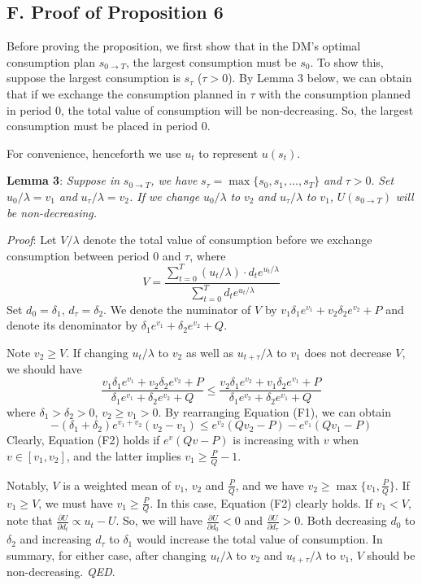\documentclass[
  12pt,
]{article}
\begin{document}
\hypertarget{f.-proof-of-proposition-6}{%
\subsection*{F. Proof of Proposition
6}\label{f.-proof-of-proposition-6}}

Before proving the proposition, we first show that in the DM's optimal
consumption plan \(s_{0\rightarrow T}\), the largest consumption must be
\(s_0\). To show this, suppose the largest consumption is \(s_\tau\)
(\(\tau>0\)). By Lemma 3 below, we can obtain that if we exchange the
consumption planned in \(\tau\) with the consumption planned in period
0, the total value of consumption will be non-decreasing. So, the
largest consumption must be placed in period 0.

For convenience, henceforth we use \(u_t\) to represent \(u(s_t)\).

\noindent \textbf{Lemma 3}: \emph{Suppose in}
\(s_{0\rightarrow T}\)\emph{, we have}
\(s_\tau= \max\{s_0,s_1,...,s_T\}\) \emph{and} \(\tau>0\). \emph{Set}
\(u_0/\lambda=v_1\) \emph{and} \(u_{\tau}/\lambda=v_2\)\emph{. If we
change} \(u_0/\lambda\) \emph{to} \(v_2\) \emph{and}
\(u_{\tau}/\lambda\) \emph{to} \(v_1\)\emph{,} \(U(s_{0\rightarrow T})\)
\emph{will be non-decreasing.}

\noindent \emph{Proof}: Let \(V/\lambda\) denote the total value of
consumption before we exchange consumption between period 0 and
\(\tau\), where\[
V = \frac{\sum_{t=0}^T (u_t/\lambda)\cdot d_t e^{u_t/\lambda}}{\sum_{t=0}^T d_te^{u_t/\lambda}}
\]Set \(d_0=\delta_1\), \(d_\tau=\delta_2\). We denote the numinator of
\(V\) by \(v_1\delta_1e^{v_1}+v_2\delta_2e^{v_2}+P\) and denote its
denominator by \(\delta_1e^{v_1}+\delta_2e^{v_2}+Q\).

Note \(v_2\geq V\). If changing \(u_t/\lambda\) to \(v_2\) as well as
\(u_{t+\tau}/\lambda\) to \(v_1\) does not decrease \(V\), we should
have
\[\tag{F1} \frac{v_1\delta_1e^{v_1}+ v_2\delta_2e^{v_2}+P}{\delta_1e^{v_1}+\delta_2e^{v_2}+Q} \leq  \frac{v_2\delta_1e^{v_2}+ v_1\delta_2e^{v_1}+P}{\delta_1e^{v_2}+\delta_2e^{v_1}+Q} \]where
\(\delta_1>\delta_2>0\), \(v_2\geq v_1>0\). By rearranging Equation
(F1), we can
obtain\[\tag{F2} -(\delta_1+\delta_2)e^{v_1+v_2}(v_2-v_1)\leq e^{v_2}(Qv_2-P)-e^{v_1}(Qv_1-P) \]Clearly,
Equation (F2) holds if \(e^v(Qv-P)\) is increasing with \(v\) when
\(v\in[v_1,v_2]\), and the latter implies \(v_1\geq \frac{P}{Q}-1\).

Notably, \(V\) is a weighted mean of \(v_1\), \(v_2\) and
\(\frac{P}{Q}\), and we have \(v_2\geq \max\{v_1,\frac{P}{Q}\}\). If
\(v_1\geq V\), we must have \(v_1\geq \frac{P}{Q}\). In this case,
Equation (F2) clearly holds. If \(v_1<V\), note that
\(\frac{\partial U}{\partial d_t}\propto u_t-U\). So, we will have
\(\frac{\partial U}{\partial d_0}<0\) and
\(\frac{\partial U}{\partial d_\tau}>0\). Both decreasing \(d_0\) to
\(\delta_2\) and increasing \(d_\tau\) to \(\delta_1\) would increase
the total value of consumption. In summary, for either case, after
changing \(u_t/\lambda\) to \(v_2\) and \(u_{t+\tau}/\lambda\) to
\(v_1\), \(V\) should be non-decreasing. \emph{QED}.
\end{document}
